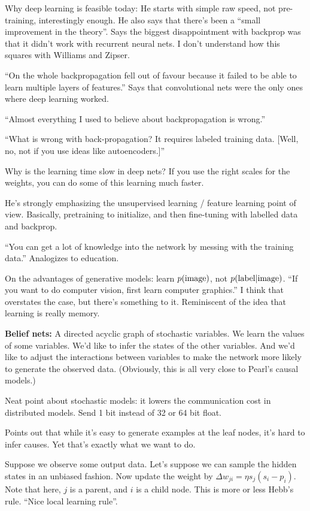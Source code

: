\documentclass[12pt]{report}
\begin{document}
Why deep learning is feasible today: He starts with simple raw speed,
not pre-training, interestingly enough.  He also says that there's
been a ``small improvement in the theory''.  Says the biggest
disappointment with backprop was that it didn't work with recurrent
neural nets.  I don't understand how this squares with Williams and
Zipser.  

``On the whole backpropagation fell out of favour because it failed to
be able to learn multiple layers of features.''  Says that
convolutional nets were the only ones where deep learning worked.

``Almost everything I used to believe about backpropagation is
wrong.''

``What is wrong with back-propagation?  It requires labeled training
data. [Well, no, not if you use ideas like autoencoders.]''

Why is the learning time slow in deep nets?  If you use the right
scales for the weights, you can do some of this learning much faster.

He's strongly emphasizing the unsupervised learning / feature learning
point of view.  Basically, pretraining to initialize, and then
fine-tuning with labelled data and backprop.

``You can get a lot of knowledge into the network by messing with the
training data.''  Analogizes to education.  

On the advantages of generative models: learn $p({\rm image})$, not
$p({\rm label | image})$.  ``If you want to do computer vision, first
learn computer graphics.''  I think that overstates the case, but
there's something to it.  Reminiscent of the idea that learning is
really memory.

\textbf{Belief nets:} A directed acyclic graph of stochastic
variables.  We learn the values of some variables.  We'd like to infer
the states of the other variables.  And we'd like to adjust the
interactions between variables to make the network more likely to
generate the observed data.  (Obviously, this is all very close to
Pearl's causal models.)

Neat point about stochastic models: it lowers the communication cost
in distributed models.  Send 1 bit instead of 32 or 64 bit float.

Points out that while it's easy to generate examples at the leaf
nodes, it's hard to infer causes.  Yet that's exactly what we want to
do.

Suppose we observe some output data.  Let's suppose we can sample the
hidden states in an unbiased fashion.  Now update the weight by
$\Delta w_{ji} = \eta s_j (s_i-p_i)$.  Note that here, $j$ is a
parent, and $i$ is a child node.  This is more or less Hebb's rule.
``Nice local learning rule''.
\end{document}
